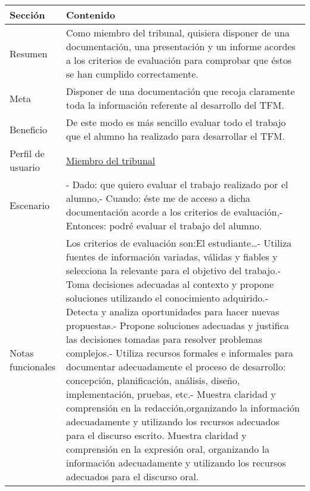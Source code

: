 \begin{table}[H]
    \centering
    \def\arraystretch{1.25}
    \begin{adjustbox}{max width=\textwidth}
    \begin{tabularx}{\textwidth}{l|L}
    \hline
        \textbf{Sección} & \textbf{Contenido} \\ \hline
    \hline
        Resumen & Como miembro del tribunal, quisiera disponer de una documentación, una presentación y un informe acordes a los criterios de evaluación para comprobar que éstos se han cumplido correctamente. \\ \hline
        Meta & Disponer de una documentación que recoja claramente toda la información referente al desarrollo del TFM. \\ \hline
        Beneficio & De este modo es más sencillo evaluar todo el trabajo que el alumno ha realizado para desarrollar el TFM. \\ \hline
        Perfil de usuario & \hyperref[sec:personaMiembroTribunal]{Miembro del tribunal} \\ \hline
        Escenario & - Dado: que quiero evaluar el trabajo realizado por el alumno,\linebreak - Cuando: éste me de acceso a dicha documentación acorde a los criterios de evaluación,\linebreak - Entonces: podré evaluar el trabajo del alumno. \\ \hline
        Notas funcionales & Los criterios de evaluación son:\linebreak \linebreak El estudiante…\linebreak - Utiliza fuentes de información variadas, válidas y fiables y selecciona la relevante para el objetivo del trabajo.\linebreak - Toma decisiones adecuadas al contexto y propone soluciones utilizando el conocimiento adquirido.\linebreak - Detecta y analiza oportunidades para hacer nuevas propuestas.\linebreak - Propone soluciones adecuadas y justifica las decisiones tomadas para resolver problemas complejos.\linebreak - Utiliza recursos formales e informales para documentar adecuadamente el proceso de desarrollo: concepción, planificación, análisis, diseño, implementación, pruebas, etc.\linebreak - Muestra claridad y comprensión en la redacción,organizando la información adecuadamente y utilizando los recursos adecuados para el discurso escrito. Muestra claridad y comprensión en la expresión oral, organizando la información adecuadamente y utilizando los recursos adecuados para el discurso oral. \\ \hline

\end{tabularx}
\end{adjustbox}
\end{table}
